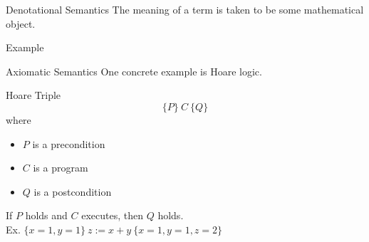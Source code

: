 \begin{frame}{Denotational Semantics}
The meaning of a term is taken to be some mathematical object.
\begin{block}{Example}
\end{block}
\end{frame}

\begin{frame}{Axiomatic Semantics}
One concrete example is Hoare logic.
\begin{block}{Hoare Triple}
$$\{P\}~C~\{Q\}$$ where
\begin{itemize}
  \item $P$ is a precondition
  \item $C$ is a program
  \item $Q$ is a postcondition
\end{itemize}
If $P$ holds and $C$ executes, then $Q$ holds.\\
Ex. $\{x=1, y=1\}~z:=x+y~\{x=1, y=1, z=2\}$
\end{block}
\end{frame}
